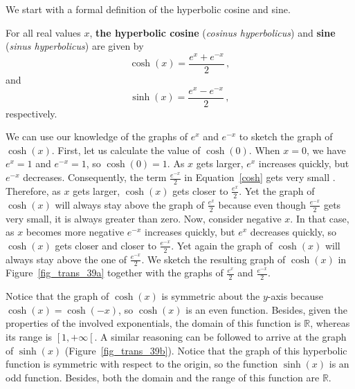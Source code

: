 We start with a formal definition of the hyperbolic cosine and sine. 

\begin{definition}
For all real values $x$, \textbf{the hyperbolic cosine} (\textit{cosinus hyperbolicus}) and \textbf{sine} (\textit{sinus hyperbolicus}) are given by
\begin{equation}
 \cosh (x) = \dfrac{e^x+e^{-x}}{2}\,,
\label{cosh}
\end{equation}
and
\begin{equation}
 \sinh (x) = \dfrac{e^x-e^{-x}}{2}\,,
\label{sinh}
\end{equation}
respectively.
\end{definition}

We can use our knowledge of the graphs of $e^x$ and $e^{-x}$ to sketch the graph of $\cosh(x)$. First, let us calculate the value of $\cosh(0)$. When $x=0$, we have $e^x=1$ and $e^{-x}=1$, so $\cosh(0)=1$.  As $x$ gets larger, $e^x$ increases quickly, but $e^{-x}$ decreases. Consequently, the term  $\frac{e^{-x}}{2}$ in Equation~\eqref{cosh} gets very small . Therefore, as $x$ gets larger, $\cosh(x)$ gets closer to $\frac{e^x}{2}$. Yet the graph of $\cosh(x)$ will always stay above the graph of $\frac{e^x}{2}$ because even though $\frac{e^{-x}}{2}$ gets very small, it is always greater than zero.  Now, consider negative $x$. In that case, as $x$ becomes more negative $e^{-x}$ increases quickly, but $e^x$ decreases quickly, so $\cosh(x)$ gets closer and closer to $\frac{e^{-x}}{2}$. Yet again the graph of $\cosh(x)$ will always stay above the one of $\frac{e^{-x}}{2}$. We sketch the resulting graph of $\cosh(x)$ in Figure~\ref{fig_trans_39a} together with the graphs of  $\frac{e^{x}}{2}$ and $\frac{e^{-x}}{2}$. 

Notice that the graph of $\cosh(x)$ is symmetric about the $y$-axis because $\cosh(x)=\cosh(-x)$, so $\cosh(x)$ is an even function. Besides, given the properties of the involved exponentials, the domain of this function is $\mathbb{R}$, whereas its range is $\left[\right.1,+\infty\left[\right.$. A similar reasoning can be followed to arrive at the graph of $\sinh(x)$ (Figure~\ref{fig_trans_39b}). Notice that the graph of this hyperbolic function is symmetric with respect to the origin, so the function $\sinh(x)$ is an odd function. Besides, both the domain and the range of this function are $\mathbb{R}$.


